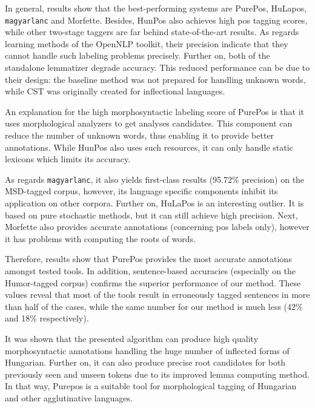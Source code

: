 In general, results show that the best-performing systems are PurePos, HuLapos, \texttt{magyarlanc} and Morfette.
Besides, HunPos also achieves high \acrshort{pos} tagging scores, while other two-stage taggers are far behind state-of-the-art results. 
As regards learning methods of the OpenNLP toolkit, their precision indicate that they cannot handle such labeling problems precisely.
Further on, both of the standalone lemmatizer degrade accuracy. 
This reduced performance can be due to their design: the baseline method was not prepared for handling unknown words, while CST was originally created for inflectional languages. 

An explanation for the high morphosyntactic labeling score of PurePos is that it uses morphological analyzers to get analyses candidates. 
This component can reduce the number of unknown words, thus enabling it to provide better annotations.
While HunPos also uses such resources, it can only handle static lexicons which limits its accuracy.

As regards \texttt{magyarlanc}, it also yields first-class results (95.72\% precision) on the MSD-tagged corpus, however, its language specific components inhibit its application on other corpora. 
Further on, HuLaPos is an interesting outlier.
It is based on pure stochastic methods, but it can still achieve high precision.
Next, Morfette also provides accurate annotations (concerning \acrshort{pos} labels only), however it has problems with computing the roots of words.

Therefore, results show that PurePos provides the most accurate annotations amongst tested tools.
In addition, sentence-based accuracies (especially on the Humor-tagged corpus) confirms the superior performance of our method. 
These values reveal that most of the tools result in erroneously tagged sentences in more than half of the cases, while the same number for our method is much less (42\% and 18\% respectively). 

It was shown that the presented algorithm can produce high quality morphosyntactic annotations handling the huge number of inflected forms of Hungarian.
Further on, it can also produce precise root candidates for both previously seen and unseen tokens due to its improved lemma computing method.
In that way, Purepos is a suitable tool for morphological tagging of Hungarian and other agglutinative languages.
%


